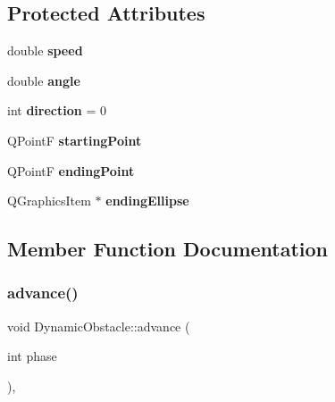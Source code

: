 \subsection*{Protected Attributes}
\begin{DoxyCompactItemize}
\item 
\mbox{\label{class_dynamic_obstacle_a57b1f4d6ce397c1fba42066c0c93ac9b}} 
double {\bfseries speed}
\item 
\mbox{\label{class_dynamic_obstacle_a82a9f801c59a03ef05e856e76731321c}} 
double {\bfseries angle}
\item 
\mbox{\label{class_dynamic_obstacle_a9ed7793ab1d8db38569d756882860bbf}} 
int {\bfseries direction} = 0
\item 
\mbox{\label{class_dynamic_obstacle_ad70ebecc813893d81bfbe03ec32c109e}} 
Q\+PointF {\bfseries starting\+Point}
\item 
\mbox{\label{class_dynamic_obstacle_af7198f0448b18664740569a2e6d5a291}} 
Q\+PointF {\bfseries ending\+Point}
\item 
\mbox{\label{class_dynamic_obstacle_a0a9b420c0c2e862d2a2bb27091d3e890}} 
Q\+Graphics\+Item $\ast$ {\bfseries ending\+Ellipse}
\end{DoxyCompactItemize}


\subsection{Member Function Documentation}
\mbox{\label{class_dynamic_obstacle_a533d0927fbe09aa105c47e00b1cd045f}} 
\subsubsection{\texorpdfstring{advance()}{advance()}}
{\footnotesize\ttfamily void Dynamic\+Obstacle\+::advance (\begin{DoxyParamCaption}\item[{int}]{phase }\end{DoxyParamCaption})\hspace{0.3cm}{\ttfamily [protected]}, {\ttfamily [virtual]}}

